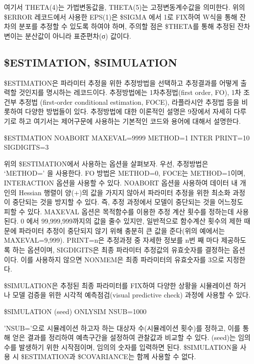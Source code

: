 \documentclass[
  10pt,
]{krantz}
\begin{document}
여기서 THETA(4)는 가법변동값을, THETA(5)는 고정변동계수값을 의미한다. 위의 \$ERROR 레코드에서 사용한
EPS(1)은 \$SIGMA 에서 1로 FIX하여 W식을 통해 잔차의 분포를 추정할 수 있도록 하여야 하며, 주의할 점은
\$THETA를 통해 추정된 잔차변이는 분산값이 아니라 표준편차(σ) 값이다.

\hypertarget{estimation-simulation}{%
\subsection{\$ESTIMATION, \$SIMULATION}\label{estimation-simulation}}

\$ESTIMATION은 파라미터 추정을 위한 추정방법을 선택하고 추정결과를 어떻게 출력할 것인지를 명시하는 레코드이다.
추정방법에는 1차추정법(first order, FO), 1차 조건부 추정법 (first-order
conditional estimation, FOCE), 라플라시안 추정법 등을 비롯하여 다양한 방법들이 있다. 추정방법에 대한
이론적인 설명은 9장에서 자세히 다루기로 하고 여기서는 제어구문에 사용하는 기본적인 코드와 용어에 대해서 설명한다.

\$ESTIMATION NOABORT MAXEVAL=9999 METHOD=1 INTER PRINT=10 SIGDIGITS=3

위의 \$ESTIMATION에서 사용하는 옵션을 살펴보자. 우선, 추정방법은 `METHOD=' 을 사용한다. FO 방법은
METHOD=0, FOCE는 METHOD=1이며, INTERACTION 옵션을 사용할 수 있다. NOABORT 옵션을 사용하여
데이터 내 개인의 Hessian 행렬이 양(+)의 값을 가지지 않아서 파라미터 추정을 위한 최소화 과정이 중단되는 것을
방지할 수 있다. 즉, 추정 과정에서 모델이 중단되는 것을 어느정도 피할 수 있다. MAXEVAL 옵션은 목적함수를 이용한
추정 계산 횟수를 정하는데 사용된다. 0 에서 99,999,999까지의 값을 줄수 있지만, 일반적으로 함수계산 횟수의 제한 때문에
파라미터 추정이 중단되지 않기 위해 충분히 큰 값을 준다(위의 예에서는 MAXEVAL=9,999). PRINT=n은 추정과정 중
자세한 정보를 n번 째 마다 제공하도록 하는 옵션이며, SIGDIGITS은 최종 파라미터 추정값의 유효숫자를 결정하는
옵션이다. 이를 사용하지 않으면 NONMEM은 최종 파라미터의 유효숫자를 3으로 지정한다.

\$SIMULATION은 추정된 최종 파라미터를 FIX하여 다양한 상황을 시뮬레이션 하거나 모델 검증을 위한 시각적
예측점검(visual predictive check) 과정에 사용할 수 있다.

\$SIMULATION (seed) ONLYSIM NSUB=1000

'NSUB='으로 시뮬레이션 하고자 하는 대상자 수(시뮬레이션 횟수)를 정하고, 이를 통해 얻은 결과를 정리하여 예측구간을
설정하여 관찰값과 비교할 수 있다. (seed)는 임의 수를 발생하기 위한 시작점이며, 임의의 숫자를 입력하면
된다. \$SIMULATION을 사용 시 \$ESTIMATION과 \$COVARIANCE는 함께 사용할 수 없다.
\end{document}
